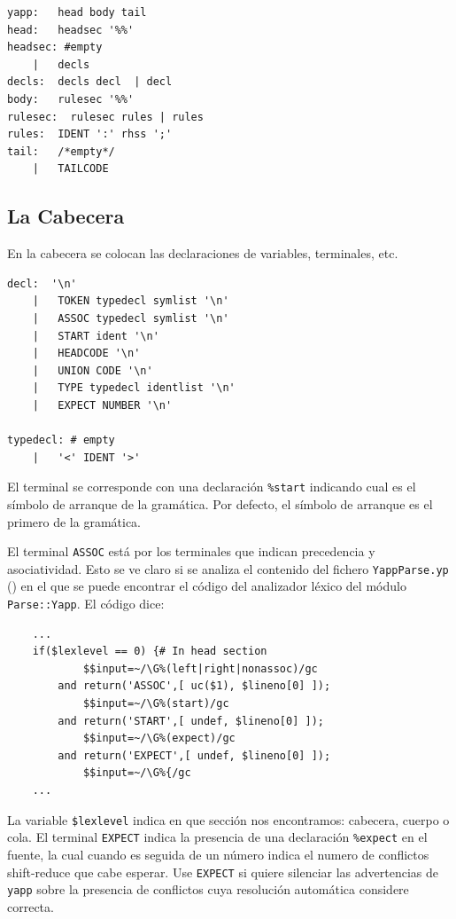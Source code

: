 \begin{verbatim}
yapp:   head body tail 
head:   headsec '%%' 
headsec: #empty  
    |   decls  
decls:  decls decl  | decl       
body:   rulesec '%%' 
rulesec:  rulesec rules | rules 
rules:  IDENT ':' rhss ';'  
tail:   /*empty*/
    |   TAILCODE   
\end{verbatim}

\subsection{La Cabecera}
En la cabecera se colocan las declaraciones de variables,
terminales, etc. 
\begin{verbatim}
decl:  '\n'                 
    |   TOKEN typedecl symlist '\n'
    |   ASSOC typedecl symlist '\n'  
    |   START ident '\n'       
    |   HEADCODE '\n'         
    |   UNION CODE '\n'      
    |   TYPE typedecl identlist '\n'
    |   EXPECT NUMBER '\n'  

typedecl: # empty
    |   '<' IDENT '>'
\end{verbatim}

El terminal  se corresponde con una declaración 
\verb|%start| indicando cual es el símbolo de arranque de la gramática.
Por defecto, el símbolo de arranque es el primero de la gramática.

El terminal \verb|ASSOC| está por los terminales que indican
precedencia y asociatividad.
Esto se ve claro si se analiza el contenido del fichero 
\verb|YappParse.yp| (\pageref{chapter:parseyp})
en el que se puede encontrar 
el código del analizador léxico del módulo 
\verb|Parse::Yapp|.
El código dice:

\begin{verbatim}
    ...
    if($lexlevel == 0) {# In head section
            $$input=~/\G%(left|right|nonassoc)/gc
        and return('ASSOC',[ uc($1), $lineno[0] ]);
            $$input=~/\G%(start)/gc
        and return('START',[ undef, $lineno[0] ]);
            $$input=~/\G%(expect)/gc
        and return('EXPECT',[ undef, $lineno[0] ]);
            $$input=~/\G%{/gc
    ...
\end{verbatim}
La variable \verb|$lexlevel| indica en que sección nos encontramos:
cabecera, cuerpo o cola. El terminal \verb|EXPECT| 
indica la presencia de una declaración \verb|%expect| en el fuente,
la cual cuando es seguida de un número indica el numero de
conflictos shift-reduce que cabe esperar. Use \verb|EXPECT|
si quiere silenciar las advertencias de \verb|yapp| sobre la presencia
de conflictos cuya resolución automática considere correcta.

